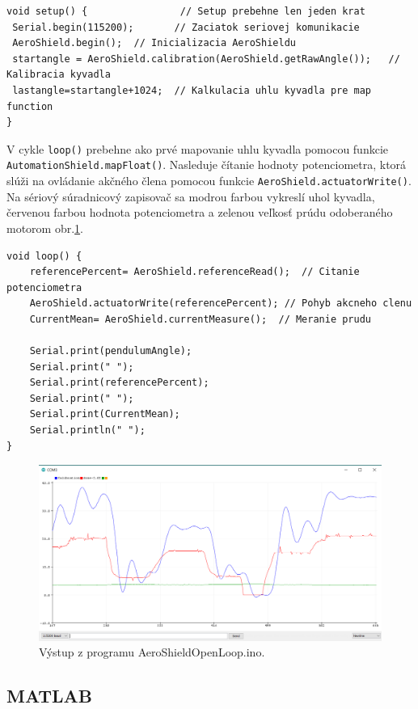 \begin{lstlisting}[caption={AeroShield open loop setup().},captionpos=b]
void setup() {                // Setup prebehne len jeden krat 
 Serial.begin(115200);       // Zaciatok seriovej komunikacie 
 AeroShield.begin();  // Inicializacia AeroShieldu 
 startangle = AeroShield.calibration(AeroShield.getRawAngle());   // Kalibracia kyvadla
 lastangle=startangle+1024;  // Kalkulacia uhlu kyvadla pre map function
}
\end{lstlisting}

V cykle \verb|loop()| prebehne ako prvé mapovanie uhlu kyvadla pomocou funkcie \verb|AutomationShield.mapFloat()|. Nasleduje čítanie hodnoty potenciometra, ktorá slúži na ovládanie akčného člena pomocou funkcie \verb|AeroShield.actuatorWrite()|. Na sériový súradnicový zapisovač sa modrou farbou vykreslí uhol kyvadla, červenou farbou hodnota potenciometra a zelenou veľkosť prúdu odoberaného motorom obr.\ref{OBRAZOK 3.1}. 

\begin{lstlisting}[caption={AeroShield open loop loop().},captionpos=b]
void loop() {
	referencePercent= AeroShield.referenceRead();  // Citanie potenciometra
	AeroShield.actuatorWrite(referencePercent); // Pohyb akcneho clenu
	CurrentMean= AeroShield.currentMeasure();  // Meranie prudu
	
	Serial.print(pendulumAngle);    
	Serial.print(" ");
	Serial.print(referencePercent);  
	Serial.print(" ");
	Serial.print(CurrentMean);   
	Serial.println(" ");
}
\end{lstlisting}

\begin{figure}[!tbh]
	\centering
	\includegraphics[width=120mm]{obr/VystupOLIDE.png}
	\caption{Výstup z programu AeroShieldOpenLoop.ino.}\label{OBRAZOK 3.1}
\end{figure}

\subsection{MATLAB}
\label{MatlabPID}

